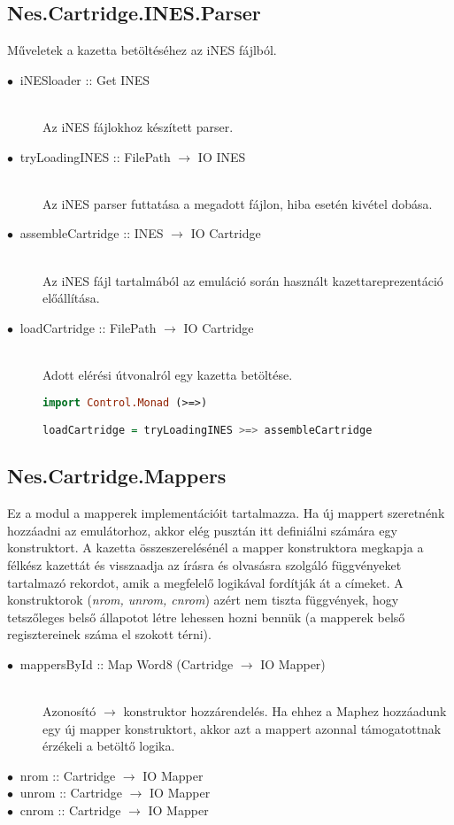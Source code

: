 \subsection{Nes.Cartridge.INES.Parser}

Műveletek a kazetta betöltéséhez az iNES fájlból.

\begin{description}
	\item[$\bullet\:$ iNESloader :: Get INES] \hfill \\
	Az iNES fájlokhoz készített parser.
	\item[$\bullet\:$ tryLoadingINES :: FilePath $\rightarrow$ IO INES] \hfill \\
	Az iNES parser futtatása a megadott fájlon, hiba esetén kivétel dobása.
	\item[$\bullet\:$ assembleCartridge :: INES $\rightarrow$ IO Cartridge] \hfill \\
	Az iNES fájl tartalmából az emuláció során használt kazettareprezentáció előállítása.
	\item[$\bullet\:$ loadCartridge :: FilePath $\rightarrow$ IO Cartridge] \hfill \\
	Adott elérési útvonalról egy kazetta betöltése.
\vspace{0.2cm}
\begin{lstlisting}[language=Haskell, basicstyle=\scriptsize]
import Control.Monad (>=>)

loadCartridge = tryLoadingINES >=> assembleCartridge
\end{lstlisting}
\end{description}

\subsection{Nes.Cartridge.Mappers}

Ez a modul a mapperek implementációit tartalmazza. Ha új mappert szeretnénk hozzáadni az emulátorhoz, akkor elég pusztán itt definiálni számára egy konstruktort. A kazetta összeszerelésénél a mapper konstruktora megkapja a félkész kazettát és visszaadja az írásra és olvasásra szolgáló függvényeket tartalmazó rekordot, amik a megfelelő logikával fordítják át a címeket.
A konstruktorok (\emph{nrom, unrom, cnrom}) azért nem tiszta függvények, hogy tetszőleges belső állapotot létre lehessen hozni bennük (a mapperek belső regisztereinek száma el szokott térni).

\begin{description}
	\item[$\bullet\:$ mappersById :: Map Word8 (Cartridge $\rightarrow$ IO Mapper)] \hfill \\
	Azonosító $\rightarrow$ konstruktor hozzárendelés. Ha ehhez a Maphez hozzáadunk egy új mapper konstruktort, akkor azt a mappert azonnal támogatottnak érzékeli a betöltő logika.
	\item[$\bullet\:$ nrom  :: Cartridge $\rightarrow$ IO Mapper]
	\item[$\bullet\:$ unrom :: Cartridge $\rightarrow$ IO Mapper]
	\item[$\bullet\:$ cnrom :: Cartridge $\rightarrow$ IO Mapper]
\end{description}


